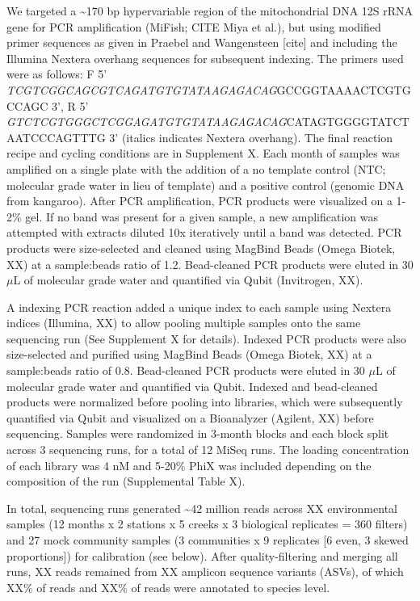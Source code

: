 \documentclass[
]{article}
\begin{document}
We targeted a \textasciitilde170 bp hypervariable region of the
mitochondrial DNA 12S rRNA gene for PCR amplification (MiFish; CITE Miya
et al.), but using modified primer sequences as given in Praebel and
Wangensteen {[}cite{]} and including the Illumina Nextera overhang
sequences for subsequent indexing. The primers used were as follows: F
5' \emph{TCGTCGGCAGCGTCAGATGTGTATAAGAGACAG}GCCGGTAAAACTCGTGCCAGC 3', R
5' \emph{GTCTCGTGGGCTCGGAGATGTGTATAAGAGACAG}CATAGTGGGGTATCTAATCCCAGTTTG
3' (italics indicates Nextera overhang). The final reaction recipe and
cycling conditions are in Supplement X. Each month of samples was
amplified on a single plate with the addition of a no template control
(NTC; molecular grade water in lieu of template) and a positive control
(genomic DNA from kangaroo). After PCR amplification, PCR products were
visualized on a 1-2\% gel. If no band was present for a given sample, a
new amplification was attempted with extracts diluted 10x iteratively
until a band was detected. PCR products were size-selected and cleaned
using MagBind Beads (Omega Biotek, XX) at a sample:beads ratio of 1.2.
Bead-cleaned PCR products were eluted in 30 \(\mu\)L of molecular grade
water and quantified via Qubit (Invitrogen, XX).

A indexing PCR reaction added a unique index to each sample using
Nextera indices (Illumina, XX) to allow pooling multiple samples onto
the same sequencing run (See Supplement X for details). Indexed PCR
products were also size-selected and purified using MagBind Beads (Omega
Biotek, XX) at a sample:beads ratio of 0.8. Bead-cleaned PCR products
were eluted in 30 \(\mu\)L of molecular grade water and quantified via
Qubit. Indexed and bead-cleaned products were normalized before pooling
into libraries, which were subsequently quantified via Qubit and
visualized on a Bioanalyzer (Agilent, XX) before sequencing. Samples
were randomized in 3-month blocks and each block split across 3
sequencing runs, for a total of 12 MiSeq runs. The loading concentration
of each library was 4 nM and 5-20\% PhiX was included depending on the
composition of the run (Supplemental Table X).

In total, sequencing runs generated \textasciitilde42 million reads
across XX environmental samples (12 months x 2 stations x 5 creeks x 3
biological replicates = 360 filters) and 27 mock community samples (3
communities x 9 replicates {[}6 even, 3 skewed proportions{]}) for
calibration (see below). After quality-filtering and merging all runs,
XX reads remained from XX amplicon sequence variants (ASVs), of which
XX\% of reads and XX\% of reads were annotated to species level.
\end{document}
